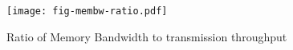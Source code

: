 \begin{figure}[H]
\texttt{[image: fig-membw-ratio.pdf]}
\caption{Ratio of Memory Bandwidth to transmission throughput}
\label{fig:membw-ratio}
\end{figure}
